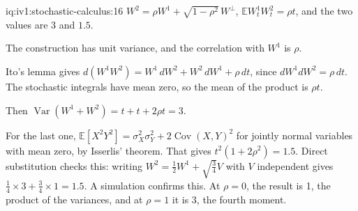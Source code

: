 \begin{solution}{iq:iv1:stochastic-calculus:16}
$W^2 = \rho W^1 + \sqrt{1 - \rho^2}\,W^\perp$, $\mathbb{E}W^1_tW^2_t = \rho t$, and the two values are 3 and $1.5$.

The construction has unit variance, and the correlation with $W^1$ is $\rho$.

Ito's lemma gives $d(W^1W^2) = W^1\,dW^2 + W^2\,dW^1 + \rho\,dt$, since $dW^1dW^2 = \rho\,dt$. The stochastic integrals have mean zero, so the mean of the product is $\rho t$.

Then $\operatorname{Var}(W^1 + W^2) = t + t + 2\rho t = 3$.

For the last one, $\mathbb{E}[X^2Y^2] = \sigma_X^2\sigma_Y^2 + 2\operatorname{Cov}(X, Y)^2$ for jointly normal variables with mean zero, by Isserlis' theorem. That gives $t^2(1 + 2\rho^2) = 1.5$. Direct substitution checks this: writing $W^2 = \frac12W^1 + \sqrt{\frac34}V$ with $V$ independent gives $\frac14 \times 3 + \frac34 \times 1 = 1.5$. A simulation confirms this. At $\rho = 0$, the result is 1, the product of the variances, and at $\rho = 1$ it is 3, the fourth moment.



\end{solution}

